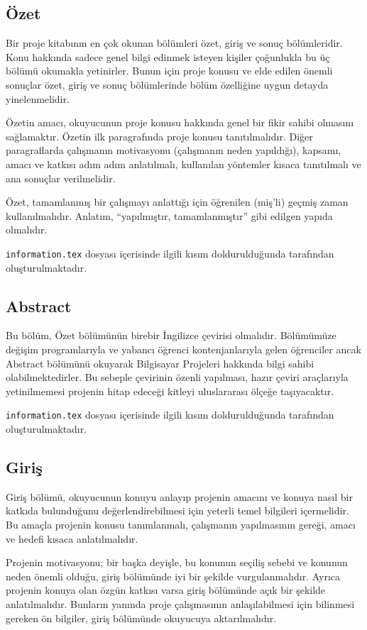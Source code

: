 \subsection{Özet} 
Bir proje kitabının en çok okunan bölümleri özet, giriş ve sonuç bölümleridir. Konu hakkında sadece genel bilgi edinmek isteyen kişiler çoğunlukla bu üç bölümü okumakla yetinirler. Bunun için proje konusu ve elde edilen önemli sonuçlar özet, giriş ve sonuç bölümlerinde bölüm özelliğine uygun detayda yinelenmelidir.
    
Özetin amacı, okuyucunun proje konusu hakkında genel bir fikir sahibi olmasını sağlamaktır. Özetin ilk paragrafında proje konusu tanıtılmalıdır. Diğer paragraflarda çalışmanın motivasyonu (çalışmanın neden yapıldığı), kapsamı, amacı ve katkısı adım adım anlatılmalı, kullanılan yöntemler kısaca tanıtılmalı ve ana sonuçlar verilmelidir.

Özet, tamamlanmış bir çalışmayı anlattığı için öğrenilen (miş’li) geçmiş zaman kullanılmalıdır. Anlatım, “yapılmıştır, tamamlanmıştır” gibi edilgen yapıda olmalıdır.

\texttt{information.tex} dosyası içerisinde ilgili kısım doldurulduğunda \latex tarafından oluşturulmaktadır.

\subsection{Abstract}

Bu bölüm, Özet bölümünün birebir İngilizce çevirisi olmalıdır. Bölümümüze değişim programlarıyla ve yabancı öğrenci kontenjanlarıyla gelen öğrenciler ancak Abstract bölümünü okuyarak Bilgisayar Projeleri hakkında bilgi sahibi olabilmektedirler. Bu sebeple çevirinin özenli yapılması, hazır çeviri araçlarıyla yetinilmemesi projenin hitap edeceği kitleyi uluslararası ölçeğe taşıyacaktır.

\texttt{information.tex} dosyası içerisinde ilgili kısım doldurulduğunda \latex tarafından oluşturulmaktadır.
    
\subsection{Giriş} 
Giriş bölümü, okuyucunun konuyu anlayıp projenin amacını ve konuya nasıl bir katkıda bulunduğunu değerlendirebilmesi için yeterli temel bilgileri içermelidir. Bu amaçla projenin konusu tanımlanmalı, çalışmanın yapılmasının gereği, amacı ve hedefi kısaca anlatılmalıdır.
    
Projenin motivasyonu; bir başka deyişle, bu konunun seçiliş sebebi ve konunun neden önemli olduğu, giriş bölümünde iyi bir şekilde vurgulanmalıdır. Ayrıca projenin konuya olan özgün katkısı varsa giriş bölümünde açık bir şekilde anlatılmalıdır. Bunların yanında proje çalışmasının anlaşılabilmesi için bilinmesi gereken ön bilgiler, giriş bölümünde okuyucuya aktarılmalıdır.

